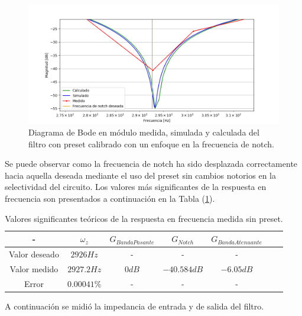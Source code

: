 \begin{figure}[H]
	\centering
	\includegraphics[width=\textwidth]{Imagenes/bode_calc_sim_med_calibrado_notch.PNG}
	\caption{Diagrama de Bode en módulo medida, simulada y calculada del filtro con preset calibrado con un enfoque en la frecuencia de notch.}
	\label{fig:bode_calc_sim_med_cal_notch}
\end{figure}


Se puede observar como la frecuencia de notch ha sido desplazada correctamente hacia aquella deseada mediante el uso del preset sin cambios notorios en la selectividad del circuito. Los valores más significantes de la respuesta en frecuencia son presentados a continuación en la Tabla (\ref{tab:rta_freq_med_conpreset}).

\begin{table}[H]
\centering
\begin{tabular}{@{}ccccccc@{}}
\toprule
- & $\omega_z$ & $G_{Banda Pasante}$  & $G_{Notch}$ & $G_{Banda Atenuante}$ \\ \midrule
Valor deseado & $2926Hz$ & - & - & - \\
Valor medido & $2927.2Hz$ & $0dB$ & $-40.584dB$ & $-6.05dB$ \\
Error & $0.00041\%$ & - & - & - \\ \bottomrule
\end{tabular}
\caption{Valores significantes teóricos de la respuesta en frecuencia medida sin preset.}
\label{tab:rta_freq_med_conpreset}
\end{table}

A continuación se midió la impedancia de entrada y de salida del filtro.

